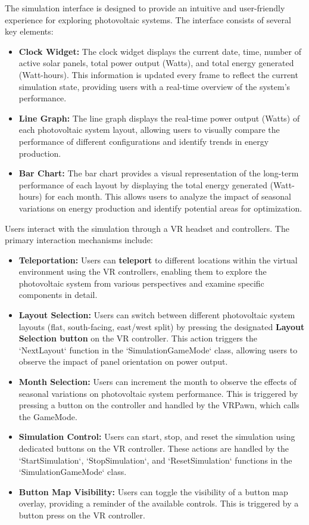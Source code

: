 \documentclass[draft, final]{vutinfth} %
\begin{document}
The simulation interface is designed to provide an intuitive and user-friendly experience for exploring photovoltaic systems. The interface consists of several key elements:

\begin{itemize}
    \item \textbf{Clock Widget:} The clock widget displays the current date, time, number of active solar panels, total power output (Watts), and total energy generated (Watt-hours). This information is updated every frame to reflect the current simulation state, providing users with a real-time overview of the system's performance.
    \item \textbf{Line Graph:} The line graph displays the real-time power output (Watts) of each photovoltaic system layout, allowing users to visually compare the performance of different configurations and identify trends in energy production.
    \item \textbf{Bar Chart:} The bar chart provides a visual representation of the long-term performance of each layout by displaying the total energy generated (Watt-hours) for each month. This allows users to analyze the impact of seasonal variations on energy production and identify potential areas for optimization.
\end{itemize}

Users interact with the simulation through a VR headset and controllers. The primary interaction mechanisms include:

\begin{itemize}
    \item \textbf{Teleportation:} Users can \textbf{teleport} to different locations within the virtual environment using the VR controllers, enabling them to explore the photovoltaic system from various perspectives and examine specific components in detail. 
    \item \textbf{Layout Selection:} Users can switch between different photovoltaic system layouts (flat, south-facing, east/west split) by pressing the designated \textbf{Layout Selection button} on the VR controller. This action triggers the `NextLayout` function in the `SimulationGameMode` class, allowing users to observe the impact of panel orientation on power output.
    \item \textbf{Month Selection:} Users can increment the month to observe the effects of seasonal variations on photovoltaic system performance. This is triggered by pressing a button on the controller and handled by the VRPawn, which calls the GameMode.
    \item \textbf{Simulation Control:} Users can start, stop, and reset the simulation using dedicated buttons on the VR controller. These actions are handled by the `StartSimulation`, `StopSimulation`, and `ResetSimulation` functions in the `SimulationGameMode` class.
    \item \textbf{Button Map Visibility:} Users can toggle the visibility of a button map overlay, providing a reminder of the available controls. This is triggered by a button press on the VR controller.
\end{itemize}
\end{document}
